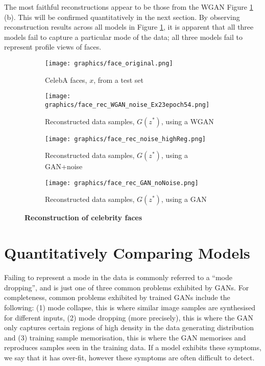 \documentclass[journal]{IEEEtran}
\begin{document}
The most faithful reconstructions appear to be those from the WGAN Figure \ref{fig:face_rec} (b). This will be confirmed quantitatively in the next section. By observing reconstruction results across all models in Figure \ref{fig:face_rec}, it is apparent that all three models fail to capture a particular mode of the data; all three models fail to represent profile views of faces.




\begin{figure}[h]
    \begin{subfigure}{\columnwidth}
        \texttt{[image: graphics/face\_original.png]}
        \caption{CelebA faces, $x$, from a test set}
    \end{subfigure}
    \begin{subfigure}{\columnwidth}
        \texttt{[image: graphics/face\_rec\_WGAN\_noise\_Ex23epoch54.png]}
        \caption{Reconstructed data samples, $G(z^*)$, using a WGAN}
    \end{subfigure}
    \begin{subfigure}{\columnwidth}
        \texttt{[image: graphics/face\_rec\_noise\_highReg.png]}
        \caption{Reconstructed data samples, $G(z^*)$, using a GAN+noise}
    \end{subfigure}
    \begin{subfigure}{\columnwidth}
        \texttt{[image: graphics/face\_rec\_GAN\_noNoise.png]}
        \caption{Reconstructed data samples, $G(z^*)$, using a GAN}
    \end{subfigure}
    \caption{\textbf{Reconstruction of celebrity faces}}
    \label{fig:face_rec}
\end{figure}



\section{Quantitatively Comparing Models}

\label{sec:troubleshooting}


Failing to represent a mode in the data is commonly referred to a ``mode dropping'', and is just one of three common problems exhibited by GANs. For completeness, common problems exhibited by trained GANs include the following: (1) mode collapse, this is where similar image samples are synthesised for different inputs, (2) mode dropping (more precisely), this is where the GAN only captures certain regions of high density in the data generating distribution and (3) training sample memorisation, this is where the GAN memorises and reproduces samples seen in the training data. If a model exhibits these symptoms, we say that it has over-fit, however these symptoms are often difficult to detect.
\end{document}
